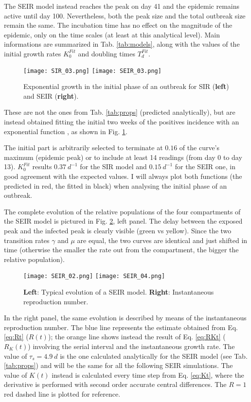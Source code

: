 \documentclass[DIV=12, BCOR=0pt]{scrartcl}  %
\begin{document}
	The SEIR model instead reaches the peak on day 41 and the epidemic remains active until day 100. Nevertheless, both the peak size and the total outbreak size remain the same. The incubation time has no effect on the magnitude of the epidemic, only on the time scales (at least at this analytical level). Main informations are summarized in Tab. \ref{tab:models}, along with the values of the initial growth rates $K_0^{Fit}$ and doubling times $T_d^{Fit}$. 
	\begin{figure}[h!]
		\centering
		\texttt{[image: SIR\_03.png]}
		\texttt{[image: SEIR\_03.png]}
		\caption{Exponential growth in the initial phase of an outbreak for SIR (\textbf{left}) and SEIR (\textbf{right}). }
		\label{fig:BothExp}
	\end{figure}

	These are not the ones from Tab. \ref{tab:props} (predicted analytically), but are instead obtained fitting the initial two weeks of the positives incidence with an exponential function \citep{Bauch2005}, as shown in Fig. \ref{fig:BothExp}.
	 
	The initial part is arbitrarily selected to terminate at $0.16$ of the curve's maximum (epidemic peak) or to include at least 14 readings (from day 0 to day 13). 
	$K_0^{Fit}$ results $0.37 \ d^{-1}$ for the SIR model and  $0.15 \ d^{-1}$ for the SEIR one, in good agreement with the expected values. I will always plot both functions (the predicted in red, the fitted in black) when analysing the initial phase of an outbreak. 
	
	
	The complete evolution of the relative populations of the four compartments of the SEIR model is pictured in Fig. \ref{fig:SEIRboth}, left panel. The delay between the exposed peak and the infected peak is clearly visible (green vs yellow). Since the two transition rates $\gamma$ and $\mu$ are equal, the two curves are identical and just shifted in time (otherwise the smaller the rate out from the compartment, the bigger the relative population).
	\begin{figure}[h]
		\centering
		\texttt{[image: SEIR\_02.png]}
		\texttt{[image: SEIR\_04.png]}
		\caption{\textbf{Left}: Typical evolution of a SEIR model. \textbf{Right}: Instantaneous reproduction number. }
		\label{fig:SEIRboth}
	\end{figure}

	In the right panel, the same evolution is described by means of the instantaneous reproduction number. The blue line represents the estimate obtained from Eq. \ref{eq:Rt} ($R(t)$); the orange line shows instead the result of Eq. \ref{eq:RKt} ($R_K(t)$) involving the serial interval and the instantaneous growth rate.  The value of $\tau_s = 4.9 \ d$ is the one calculated analytically for the SEIR model (see Tab. \ref{tab:props}) and will be the same for all the following SEIR simulations.
	The value of $K(t)$ instead is calculated every time step from Eq. \ref{eq:Kt}, where the derivative is performed with second order accurate central differences. The $R = 1$ red dashed line is plotted for reference.
\end{document}
